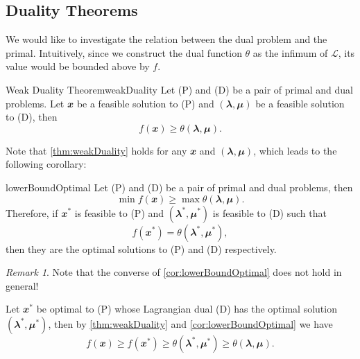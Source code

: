 \documentclass[math, code]{amznotes}
\theoremstyle{remark}
\newtheorem*{remark}{Remark}
\begin{document}
\subsection{Duality Theorems}
We would like to investigate the relation between the dual problem and the primal. Intuitively, since we construct the dual function $\theta$ as the infimum of $\mathcal{L}$, its value would be bounded above by $f$.
\begin{thmbox}{Weak Duality Theorem}{weakDuality}
    Let (P) and (D) be a pair of primal and dual problems. Let $\mathbfit{x}$ be a feasible solution to (P) and $(\mathbfit{\lambda}, \mathbfit{\mu})$ be a feasible solution to (D), then
    \begin{equation*}
        f(\mathbfit{x}) \geq \theta(\mathbfit{\lambda}, \mathbfit{\mu}).
    \end{equation*}
\end{thmbox}
Note that \ref{thm:weakDuality} holds for any $\mathbfit{x}$ and $(\mathbfit{\lambda}, \mathbfit{\mu})$, which leads to the following corollary:
\begin{corbox}{}{lowerBoundOptimal}
    Let (P) and (D) be a pair of primal and dual problems, then
    \begin{equation*}
        \min f(\mathbfit{x}) \geq \max \theta(\mathbfit{\lambda}, \mathbfit{\mu}).
    \end{equation*}
    Therefore, if $\mathbfit{x}^*$ is feasible to (P) and $(\mathbfit{\lambda}^*, \mathbfit{\mu}^*)$ is feasible to (D) such that
    \begin{equation*}
        f(\mathbfit{x}^*) = \theta(\mathbfit{\lambda}^*, \mathbfit{\mu}^*),
    \end{equation*}
    then they are the optimal solutions to (P) and (D) respectively.
\end{corbox}
\begin{notebox}
    \begin{remark}
        Note that the converse of \ref{cor:lowerBoundOptimal} does not hold in general!
    \end{remark}
\end{notebox}
Let $\mathbfit{x}^*$ be optimal to (P) whose Lagrangian dual (D) has the optimal solution $(\mathbfit{\lambda}^*, \mathbfit{\mu}^*)$, then by \ref{thm:weakDuality} and \ref{cor:lowerBoundOptimal} we have
\begin{equation*}
    f(\mathbfit{x}) \geq f(\mathbfit{x}^*) \geq \theta(\mathbfit{\lambda}^*, \mathbfit{\mu}^*) \geq \theta(\mathbfit{\lambda}, \mathbfit{\mu}).
\end{equation*}
\end{document}
